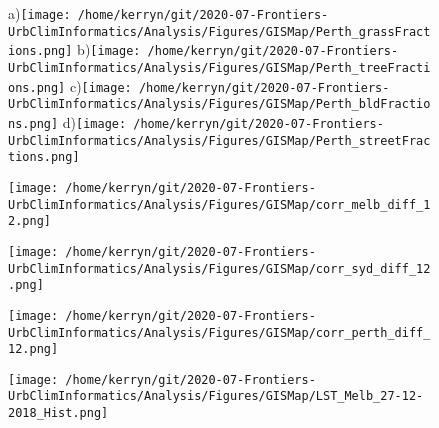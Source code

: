 \documentclass{article}
\begin{document}
\begin{figure}
\centering    
a)\texttt{[image: /home/kerryn/git/2020-07-Frontiers-UrbClimInformatics/Analysis/Figures/GISMap/Perth\_grassFractions.png]}
b)\texttt{[image: /home/kerryn/git/2020-07-Frontiers-UrbClimInformatics/Analysis/Figures/GISMap/Perth\_treeFractions.png]}
c)\texttt{[image: /home/kerryn/git/2020-07-Frontiers-UrbClimInformatics/Analysis/Figures/GISMap/Perth\_bldFractions.png]}
d)\texttt{[image: /home/kerryn/git/2020-07-Frontiers-UrbClimInformatics/Analysis/Figures/GISMap/Perth\_streetFractions.png]}
\end{figure} 
\clearpage




\begin{figure} %
\texttt{[image: /home/kerryn/git/2020-07-Frontiers-UrbClimInformatics/Analysis/Figures/GISMap/corr\_melb\_diff\_12.png]}
\end{figure} 
\clearpage

\begin{figure} %
\texttt{[image: /home/kerryn/git/2020-07-Frontiers-UrbClimInformatics/Analysis/Figures/GISMap/corr\_syd\_diff\_12.png]}
\end{figure} 
\clearpage

\begin{figure} %
\texttt{[image: /home/kerryn/git/2020-07-Frontiers-UrbClimInformatics/Analysis/Figures/GISMap/corr\_perth\_diff\_12.png]}
\end{figure} 
\clearpage


\begin{figure} %
\texttt{[image: /home/kerryn/git/2020-07-Frontiers-UrbClimInformatics/Analysis/Figures/GISMap/LST\_Melb\_27-12-2018\_Hist.png]}
\end{figure} 
\clearpage
\end{document}
